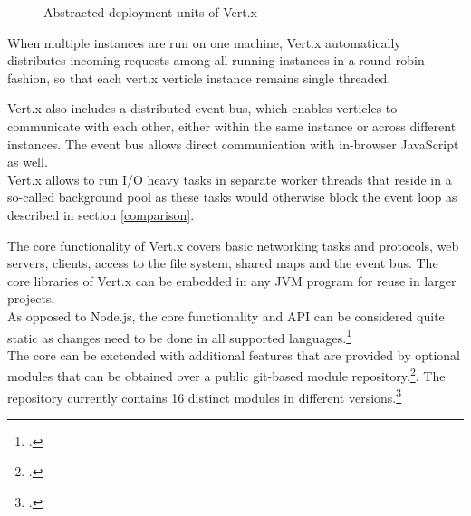 \begin{figure}[h]
	\centering
	\setlength\fboxsep{2pt}
	\caption{Abstracted deployment units of Vert.x}
	\label{fig:vertx_constructs}
\end{figure}

When multiple instances are run on one machine, Vert.x automatically distributes incoming
requests among all running instances in a round-robin fashion, so that each
vert.x verticle instance remains single threaded.

Vert.x also includes a distributed event bus, which enables verticles to
communicate with each other, either within the same instance or across different
instances. The event bus allows direct communication with in-browser JavaScript as well.\\
Vert.x allows to run I/O heavy tasks in separate worker threads that reside in a
so-called background pool as these tasks would otherwise block the event loop as
described in section \ref{comparison}.

The core functionality of Vert.x covers basic networking tasks and protocols,
web servers, clients, access to the file system, shared maps and the event bus.
The core libraries of Vert.x can be embedded in any JVM program for reuse in
larger projects.\\
As opposed to Node.js, the core functionality and API can be considered quite
static as changes need to be done in all supported
languages.\footcite[Cf.][]{vertx_2012}\\ %
The core can be exctended with additional features that are provided by optional
modules that can be obtained over a public git-based module
repository.\footcite[Cf.][]{vertx_mod_2012}.
The repository currently contains 16 distinct modules in different
versions.\footcite[Cf.][]{Vertx_repository_2012}

